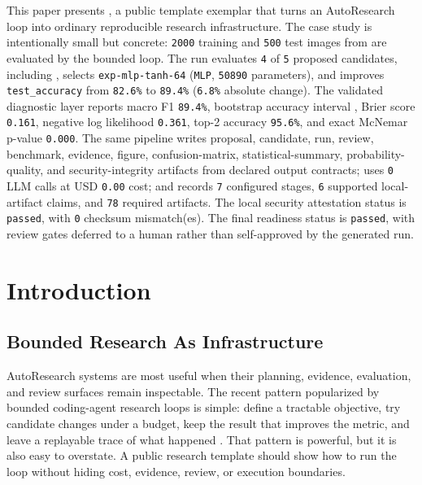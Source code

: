 \documentclass[
]{article}
\begin{document}
This paper presents
,
a public template exemplar that turns an AutoResearch loop into ordinary
reproducible research infrastructure. The case study is intentionally
small but concrete: \texttt{2000} training and \texttt{500} test images
from  are evaluated by the
bounded  loop. The
run evaluates \texttt{4} of \texttt{5} proposed candidates, including
, selects
\texttt{exp-mlp-tanh-64} (\texttt{MLP}, \texttt{50890} parameters), and
improves \texttt{test\_accuracy} from \texttt{82.6\%} to \texttt{89.4\%}
(\texttt{6.8\%} absolute change). The validated diagnostic layer reports
macro F1 \texttt{89.4\%}, bootstrap accuracy interval
, Brier score \texttt{0.161}, negative log
likelihood \texttt{0.361}, top-2 accuracy \texttt{95.6\%}, and exact
McNemar p-value \texttt{0.000}. The same pipeline writes proposal,
candidate, run, review, benchmark, evidence, figure, confusion-matrix,
statistical-summary, probability-quality, and security-integrity
artifacts from declared output contracts; uses \texttt{0} LLM calls at
USD \texttt{0.00} cost; and records \texttt{7} configured stages,
\texttt{6} supported local-artifact claims, and \texttt{78} required
artifacts. The local security attestation status is \texttt{passed},
with \texttt{0} checksum mismatch(es). The final readiness status is
\texttt{passed}, with review gates deferred to a human rather than
self-approved by the generated run.

\newpage

\section{Introduction}\label{sec:introduction}

\subsection{Bounded Research As
Infrastructure}\label{sec:bounded-research-infrastructure}

AutoResearch systems are most useful when their planning, evidence,
evaluation, and review surfaces remain inspectable. The recent pattern
popularized by bounded coding-agent research loops is simple: define a
tractable objective, try candidate changes under a budget, keep the
result that improves the metric, and leave a replayable trace of what
happened \citep{karpathy_autoresearch_2026}. That pattern is powerful,
but it is also easy to overstate. A public research template should show
how to run the loop without hiding cost, evidence, review, or execution
boundaries.
\end{document}
